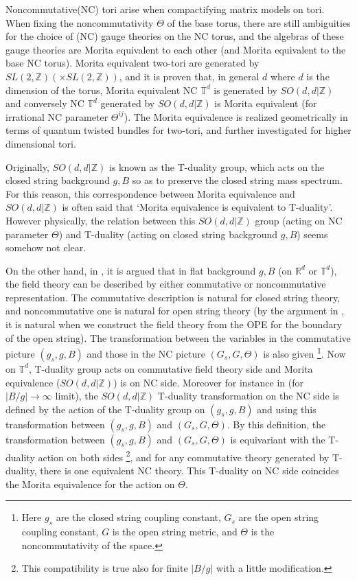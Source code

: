 \documentclass[a4paper,12pt]{article}
\newcommand{\R}{{\mathbb{R}}}
\newcommand{\Z}{{\mathbb{Z}}}
\newcommand{\T}{{\mathbb{T}}}
\def \raw{\rightarrow}
\begin{document}
Noncommutative(NC) tori arise when compactifying matrix models 
on tori\cite{CDS}. 
When fixing the noncommutativity $\Theta$ of the base torus, 
there are still ambiguities for the choice of 
(NC) gauge theories on the NC torus, 
and the algebras of these gauge theories are Morita 
equivalent to each other (and Morita equivalent 
to the base NC torus). 
%
Morita equivalent two-tori are generated by 
$SL(2,\Z) (\times SL(2,\Z))$\cite{CDS}, and it is proven that, 
in general $d$ where $d$ is the dimension of the torus, 
Morita equivalent NC $\T^d$ is generated by $SO(d,d |\Z)$
\cite{S} 
and conversely NC $\T^d$ generated by $SO(d,d |\Z)$ is 
Morita equivalent\cite{RS,R} (for irrational NC parameter 
$\Theta^{ij}$). 
The Morita equivalence is realized geometrically in terms of 
quantum twisted bundles for two-tori\cite{Ho,MZ}, and further 
investigated for higher dimensional tori\cite{BMZ}. 

Originally, 
$SO(d,d |\Z)$ is known as the T-duality group, which acts on the 
closed string background $g, B$ so as to 
preserve the closed string mass spectrum\cite{GPR}. 
For this reason, this correspondence between Morita equivalence and 
$SO(d,d|\Z)$ is often said that 
`Morita equivalence is equivalent to T-duality'. 
However physically, the relation between this $SO(d,d |\Z)$ group 
(acting on NC parameter $\Theta$) and T-duality (acting on 
closed string background $g, B$) seems somehow not clear.  

On the other hand, in \cite{SW}, it is argued that in flat background 
$g, B$ (on $\R^d$  or $\T^d$), the field theory can be described by 
either commutative or noncommutative representation. 
The commutative description is natural for closed string theory, 
and noncommutative one is natural for open string theory 
(by the argument 
in \cite{SW}, it is natural when we construct the field theory 
from the OPE for the boundary of the open string). 
The transformation between the variables 
in the commutative picture $(g_s, g, B)$ and those in the NC 
picture $(G_s, G, \Theta)$ is also given
\footnote{Here $g_s$ are the closed string coupling constant, 
$G_s$ are the open string coupling constant, $G$ is the open string metric, 
and $\Theta$ is the noncommutativity of the space.}. 
Now on $\T^d$, T-duality group acts on commutative field theory side 
and Morita equivalence ($SO(d,d |\Z)$) is on NC side. 
Moreover for instance in \cite{SW} (for $|B/g| \raw\infty$ limit), 
the $SO(d,d|\Z)$ T-duality transformation 
on the NC side is defined 
by the action of the T-duality group on $(g_s, g, B)$ 
and using this transformation between $(g_s, g, B)$ and $(G_s, G, \Theta)$. 
By this definition, 
the transformation between $(g_s, g, B)$ and $(G_s, G, \Theta)$ is 
equivariant with the T-duality action on both sides
\footnote{This compatibility is true also for finite $|B/g|$ 
with a little modification\cite{PS}. }, 
and for any commutative theory generated by T-duality, 
there is one equivalent NC theory. 
This T-duality on NC side coincides the Morita equivalence 
for the action on $\Theta$. 
\end{document}
